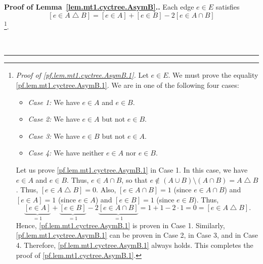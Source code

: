 \documentclass[numbers=enddot,12pt,final,onecolumn,notitlepage]{scrartcl}%
\theoremstyle{definition}
\newenvironment{proof}[1][Proof]{\noindent\textbf{#1.} }{\ \rule{0.5em}{0.5em}}
\newcommand{\tup}[1]{\left( #1 \right)}
\newcommand{\ive}[1]{\left[ #1 \right]}
\begin{document}
\begin{proof}[Proof of Lemma~\ref{lem.mt1.cyctree.AsymB}.]
Each edge $e \in E$ satisfies
\begin{equation}
\ive{e \in A \bigtriangleup B}
= \ive{e \in A} + \ive{e \in B} - 2 \ive{e \in A \cap B}
\label{pf.lem.mt1.cyctree.AsymB.1}
\end{equation}
\footnote{\textit{Proof of \eqref{pf.lem.mt1.cyctree.AsymB.1}.}
Let $e \in E$. We must prove the equality
\eqref{pf.lem.mt1.cyctree.AsymB.1}.
We are in one of the following four cases:
\begin{itemize}
\item \textit{Case 1:} We have $e \in A$ and $e \in B$.
\item \textit{Case 2:} We have $e \in A$ but not $e \in B$.
\item \textit{Case 3:} We have $e \in B$ but not $e \in A$.
\item \textit{Case 4:} We have neither $e \in A$ nor $e \in B$.
\end{itemize}
Let us prove \eqref{pf.lem.mt1.cyctree.AsymB.1} in Case 1. In this
case, we have $e \in A$ and $e \in B$. Thus, $e \in A \cap B$, so
that $e \notin \tup{A \cup B} \setminus \tup{A \cap B}
= A \bigtriangleup B$. Thus, $\ive{e \in A \bigtriangleup B} = 0$.
Also, $\ive{e \in A \cap B} = 1$ (since $e \in A \cap B$) and
$\ive{e \in A} = 1$ (since $e \in A$) and $\ive{e \in B} = 1$ (since
$e \in B$). Thus,
\[
\underbrace{\ive{e \in A}}_{= 1}
 + \underbrace{\ive{e \in B}}_{= 1}
 - 2 \underbrace{\ive{e \in A \cap B}}_{= 1}
= 1 + 1 - 2 \cdot 1 = 0 = \ive{e \in A \bigtriangleup B} .
\]
Hence, \eqref{pf.lem.mt1.cyctree.AsymB.1} is proven in Case 1.
Similarly, \eqref{pf.lem.mt1.cyctree.AsymB.1} can be proven in Case 2,
in Case 3, and in Case 4. Therefore,
\eqref{pf.lem.mt1.cyctree.AsymB.1} always holds. This completes the
proof of \eqref{pf.lem.mt1.cyctree.AsymB.1}.}.


\end{proof}
\end{document}
